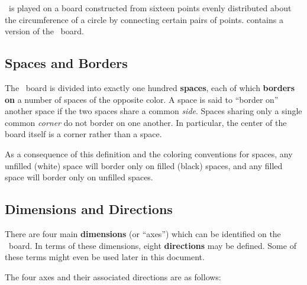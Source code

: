 %

\know\ is played on a board constructed from sixteen points
evenly distributed about the circumference of a circle by
connecting certain pairs of points.   contains
a version of the \know\ board.

\subsection{Spaces and Borders}\label{spaces}

  The \know\ board is divided into exactly one hundred {\bf spaces}, each
  of which {\bf borders on} a number of spaces of the opposite color.
  A space is said to ``border on'' another space if the two spaces share
  a common {\sl side}.  Spaces sharing only a single common {\sl corner} do not
  border on one another.  In particular, the center of the board itself
  is a corner rather than a space.

  As a consequence of this definition and the coloring conventions
  for spaces, any unfilled (white) space will border only on
  filled (black) spaces, and any filled space will border only on
  unfilled spaces.



\subsection{Dimensions and Directions}\label{directions}

  There are four main {\bf dimensions} (or ``axes'')
  which can be identified on the \know\ board.  In terms of these
  dimensions, eight {\bf directions} may be defined.
  Some of these terms might even be used later in this document.

  The four axes and their associated directions are as follows:

